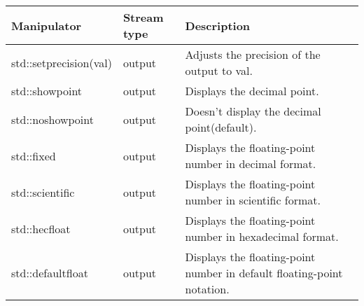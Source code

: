 \begin{longtable}[c]{|l|l|l|}
\hline
\textbf{Manipulator}   & \textbf{Stream type} & \textbf{Description}                                      \\ \hline
\endfirsthead
%
\endhead
%
std::setprecision(val) & output               & Adjusts the precision of the output to val.               \\ \hline
std::showpoint         & output               & Displays the decimal point.                               \\ \hline
std::noshowpoint       & output               & Doesn't display the decimal point(default).               \\ \hline
std::fixed             & output               & Displays the floating-point number in decimal format.     \\ \hline
std::scientific        & output               & Displays the floating-point number in scientific format.  \\ \hline
std::hecfloat          & output               & Displays the floating-point number in hexadecimal format. \\ \hline
std::defaultfloat & output & Displays the floating-point number in default floating-point notation. \\ \hline
\end{longtable}


